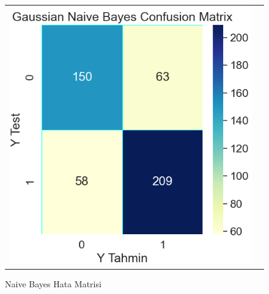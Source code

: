 \documentclass[conference]{IEEEtran}
\begin{document}
\begin{figure}[!h]
	\centering
	\begin{center}
		\begin{tabular}{cc}
			\includegraphics[scale=0.4]{pictures/pic_12.png}&
		\end{tabular}
	\end{center}
	\caption{Naive Bayes Hata Matrisi}
	\label{fig:12}
\end{figure}
\end{document}
